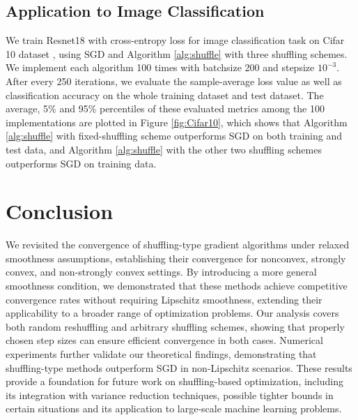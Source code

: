 \documentclass{article} %
\theoremstyle{plain}
\theoremstyle{definition}
\theoremstyle{remark}
\begin{document}
\subsection{Application to Image Classification}
We train Resnet18 \citep{he2016deep} with cross-entropy loss for image classification task on Cifar 10 dataset \citep{krizhevsky2009learning}, using SGD and Algorithm \ref{alg:shuffle} with three shuffling schemes. We implement each algorithm 100 times with batchsize 200 and stepsize $10^{-3}$. After every 250 iterations, we evaluate the sample-average loss value as well as classification accuracy on the whole training dataset and test dataset. The average, 5\% and 95\% percentiles of these evaluated metrics among the 100 implementations are plotted in Figure \ref{fig:Cifar10}, which shows that Algorithm \ref{alg:shuffle} with fixed-shuffling scheme outperforms SGD on both training and test data, and Algorithm \ref{alg:shuffle} with the other two shuffling schemes outperforms SGD on training data.



\section{Conclusion}
We revisited the convergence of shuffling-type gradient algorithms under relaxed smoothness assumptions, 
establishing their convergence for nonconvex, strongly convex, and non-strongly convex settings. 
By introducing a more general smoothness condition, we demonstrated that these methods achieve 
competitive convergence rates without requiring Lipschitz smoothness, extending their applicability 
to a broader range of optimization problems. Our analysis covers both random reshuffling and arbitrary 
shuffling schemes, showing that properly chosen step sizes can ensure efficient convergence in both cases. 
Numerical experiments further validate our theoretical findings, demonstrating that shuffling-type methods 
outperform SGD in non-Lipschitz scenarios. These results provide a foundation for future work on 
shuffling-based optimization, including its integration with variance reduction techniques, possible tighter bounds in certain situations and its application 
to large-scale machine learning problems.
\end{document}
